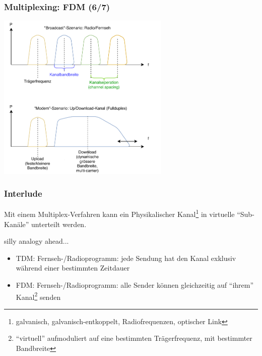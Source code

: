 \documentclass[ignorenonframetext]{beamer}
\begin{document}
\begin{frame}
\frametitle{Multiplexing: FDM (6/7)}
\includegraphics[height=8cm]{fm-spectra}
\end{frame}








\begin{frame}
\frametitle{Interlude}


Mit einem Multiplex-Verfahren kann ein Physikalischer Kanal\footnote{galvanisch, galvanisch-entkoppelt, Radiofrequenzen, optischer Link} in virtuelle ``Sub-Kan\"ale'' unterteilt werden. 

\begin{tiny}silly analogy ahead...\end{tiny}
\begin{itemize}
  \item TDM: Fernseh-/Radioprogramm: jede Sendung hat den Kanal exklusiv w\"ahrend einer bestimmten Zeitdauer
  \item FDM: Fernseh-/Radioprogramm: alle Sender k\"onnen gleichzeitig auf ``ihrem'' Kanal\footnote{``virtuell'' aufmoduliert auf eine bestimmten Tr\"agerfrequenz, mit bestimmter Bandbreite} senden 
\end{itemize}
\end{frame}
\end{document}
